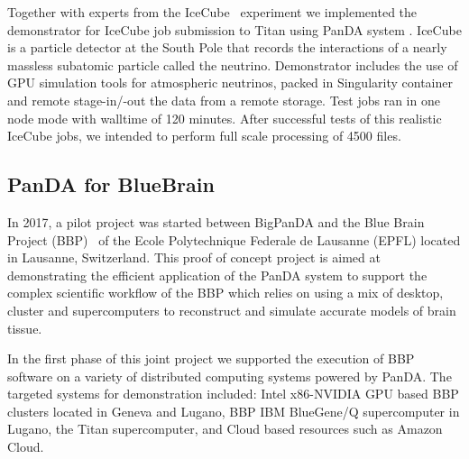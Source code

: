 \documentclass{webofc}
\begin{document}
Together with experts from the IceCube~\cite{doi:10.1063/1.3480478} experiment we implemented the demonstrator for IceCube job submission to Titan using PanDA system . 
IceCube is a particle detector at the South Pole that records the interactions of a nearly massless subatomic particle called the neutrino. 
Demonstrator includes the use of GPU simulation tools for atmospheric neutrinos, packed in Singularity container and remote stage-in/-out the data from a remote storage. 
Test jobs ran in one node mode with walltime of 120 minutes. After successful tests of this realistic IceCube jobs, we intended to perform full scale processing of 4500 files.


\subsection{PanDA for BlueBrain} \label{section_bluebrain}

In 2017, a pilot project was started between BigPanDA and the Blue Brain Project (BBP)~\cite{Markram:BBP} of the Ecole Polytechnique Federale de Lausanne (EPFL) located in Lausanne, Switzerland. This proof of concept project is aimed at demonstrating the efficient application of the PanDA system to support the complex scientific workflow of the BBP which relies on using a mix of desktop, cluster and supercomputers to reconstruct and simulate accurate models of brain tissue.

In the first phase of this joint project we supported the execution of BBP software on a variety of distributed computing systems powered by PanDA. 
The targeted systems for demonstration included: Intel x86-NVIDIA GPU based BBP clusters located in Geneva and Lugano, BBP IBM BlueGene/Q supercomputer in Lugano, the Titan supercomputer, and Cloud based resources such as Amazon Cloud.
\end{document}
